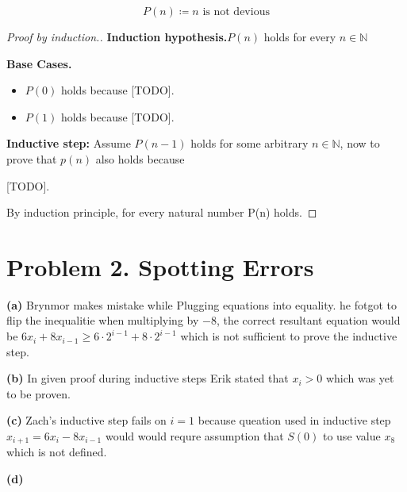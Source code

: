 \documentclass{article}
\begin{document}
\[P(n) \coloneqq \text{$n$ is not devious}\]

\begin{proof}[Proof by induction.]
    
    \textbf{Induction hypothesis.}$P(n)$ holds for every $n \in \mathbb{N}$

    \textbf{Base Cases.}
    
    \begin{itemize}[leftmargin=\parindent]
        \item $P(0)$ holds because [TODO].
        \item $P(1)$ holds because [TODO].
    \end{itemize}
    
    \textbf{Inductive step:} Assume $P(n-1)$ holds for some arbitrary $n \in \mathbb{N}$,
    now to prove that $p(n)$ also holds because 
    
    [TODO].

    By induction principle, for every natural number P(n) holds.
\end{proof}

\section*{Problem 2. Spotting Errors}

\noindent\textbf{(a)} Brynmor makes mistake while Plugging equations into equality. he fotgot to flip the inequalitie when multiplying by $-8$,
the correct resultant equation would be $6x_i + 8x_{i-1} \geq 6 \cdot 2^{i-1} + 8 \cdot 2^{i-1}$ which is not sufficient to 
prove the inductive step.

\vspace{\baselineskip}
\noindent\textbf{(b)} In given proof during inductive steps Erik stated that $x_i > 0$ which was yet to be proven.

\vspace{\baselineskip}
\noindent\textbf{(c)} Zach's inductive step fails on $i = 1$ because queation used in inductive step $x_{i+1} = 6x_i - 8x_{i-1}$ would 
would requre assumption that $S(0 )$ to use value $x_8$ which is not defined.

\pagebreak

\vspace{\baselineskip}
\noindent\textbf{(d)}
\end{document}
